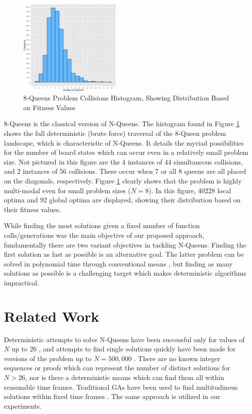 \documentclass[conference]{IEEEtran}
\begin{document}
\begin{figure}[h!]
\centerline{\includegraphics[width=0.45\textwidth]{figures/8_queens_histogram.png}}
\caption{8-Queens Problem Collisions Histogram, Showing Distribution Based on Fitness Values}
\label{fig:histogram}
\end{figure}

8-Queens is the classical version of N-Queens. The histogram found in Figure \ref{fig:histogram} shows the full deterministic (brute force) traversal of the 8-Queen problem landscape, which is characteristic of N-Queens. It details the myriad possibilities for the number of board states which can occur even in a relatively small problem size. Not pictured in this figure are the 4 instances of 44 simultaneous collisions, and 2 instances of 56 collisions. These occur when 7 or all 8 queens are all placed on the diagonals, respectively. Figure \ref{fig:histogram} clearly shows that the problem is highly multi-modal even for small problem sizes ($N = 8$). In this figure, 40228 local optima and 92 global optima are displayed, showing their distribution based on their fitness values.

While finding the most solutions given a fixed number of function calls/generations was the main objective of our proposed approach, fundamentally there are two variant objectives in tackling N-Queens. Finding the first solution as fast as possible is an alternative goal. The latter problem can be solved in polynomial time through conventional means \cite{cit:22,cit:23}, but finding as many solutions as possible is a challenging target which makes deterministic algorithms impractical.

\section{Related Work}
Deterministic attempts to solve N-Queens have been successful only for values of $N$ up to 26 \cite{cit:20,cit:24}, and attempts to find single solutions quickly have been made for versions of the problem up to {$N = 500,000$} \cite{cit:21}. There are no known integer sequences or proofs which can represent the number of distinct solutions for $N > 26$, nor is there a deterministic means which can find them all within reasonable time frames. Traditional GAs have been used to find multitudinous solutions within fixed time frames \cite{cit:9,cit:10}. The same approach is utilized in our experiments.
\end{document}
